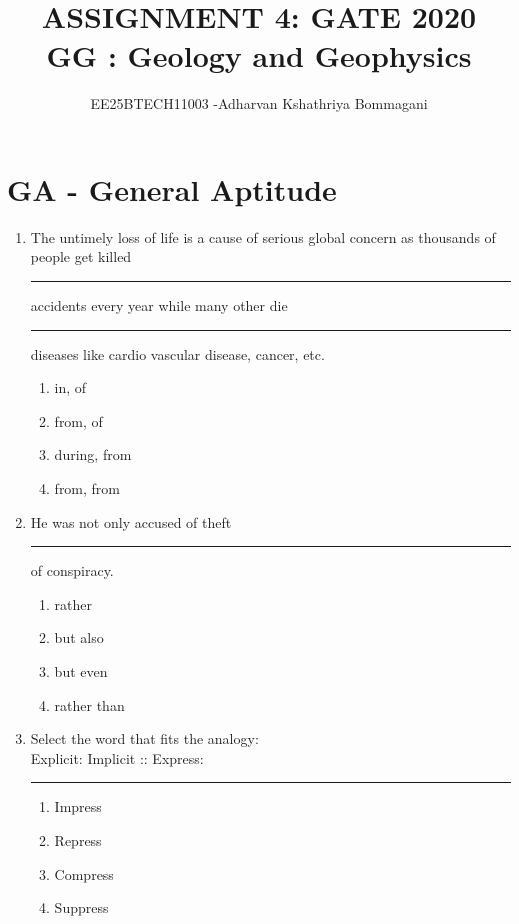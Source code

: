 \documentclass[journal,12pt,onecolumn]{IEEEtran}
\begin{document}
\title{
ASSIGNMENT 4: GATE 2020\\
GG : Geology and Geophysics}
\author{EE25BTECH11003 -Adharvan Kshathriya Bommagani}
\maketitle
\section*{GA - General Aptitude}

\begin{enumerate}


\item The untimely loss of life is a cause of serious global concern as thousands of people get killed \rule{1cm}{0.15mm} accidents every year while many other die \rule{1cm}{0.15mm} diseases like cardio vascular disease, cancer, etc.

\hfill{}
\begin{multicols}{4}
\begin{enumerate}
    \item in, of
    \item from, of
    \item during, from
    \item from, from
\end{enumerate}
\end{multicols}

\item He was not only accused of theft \rule{1cm}{0.15mm} of conspiracy.

\hfill{}
\begin{multicols}{4}
\begin{enumerate}
    \item rather
    \item but also
    \item but even
    \item rather than
\end{enumerate}
\end{multicols}

\item Select the word that fits the analogy: \\
Explicit: Implicit :: Express: \rule{1cm}{0.15mm}

\hfill{}
\begin{multicols}{4}
\begin{enumerate}
    \item Impress
    \item Repress
    \item Compress
    \item Suppress
\end{enumerate}
\end{multicols}


\end{enumerate}
\end{document}
